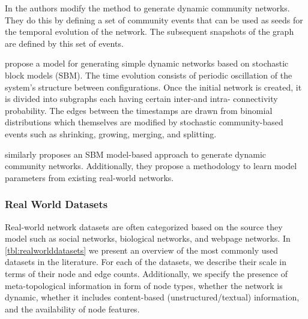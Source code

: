 \documentclass[
acmsmall,
nonacm,
screen,
acmthm]{../../scripts/pandoc/templates/acmart}
\begin{document}
In \citet{greeneTrackingEvolutionCommunities2010} the authors modify the
\citet{lancichinettiBenchmarkGraphsTesting2008} method to generate
dynamic community networks. They do this by defining a set of community
events that can be used as seeds for the temporal evolution of the
network. The subsequent snapshots of the graph are defined by this set
of events.

\citet{granellBenchmarkModelAssess2015} propose a model for generating
simple dynamic networks based on stochastic block models (SBM). The time
evolution consists of periodic oscillation of the system's structure
between configurations. Once the initial network is created, it is
divided into subgraphs each having certain inter-and intra- connectivity
probability. The edges between the timestamps are drawn from binomial
distributions which themselves are modified by stochastic
community-based events such as shrinking, growing, merging, and
splitting.

\citet{ghalebiDynamicNetworkModel2019} similarly proposes an SBM
model-based approach to generate dynamic community networks.
Additionally, they propose a methodology to learn model parameters from
existing real-world networks.

\hypertarget{real-world-datasets}{%
\subsubsection{Real World Datasets}\label{real-world-datasets}}

Real-world network datasets are often categorized based on the source
they model such as social networks, biological networks, and webpage
networks. In \cref{tbl:realworlddatasets} we present an overview of the
most commonly used datasets in the literature. For each of the datasets,
we describe their scale in terms of their node and edge counts.
Additionally, we specify the presence of meta-topological information in
form of node types, whether the network is dynamic, whether it includes
content-based (unstructured/textual) information, and the availability
of node features.
\end{document}
